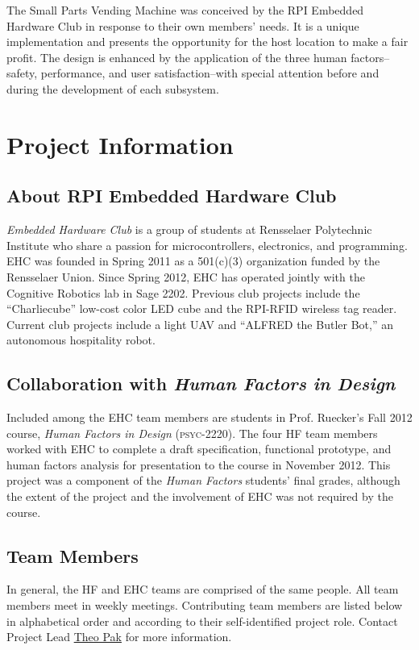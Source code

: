 \documentclass[12pt,draft,oneside]{article}
\begin{document}
The Small Parts Vending Machine was conceived by the RPI Embedded Hardware Club in response to their own members' needs. It is a unique implementation and presents the opportunity for the host location to make a fair profit. The design is enhanced by the application of the three human factors--safety, performance, and user satisfaction--with special attention before and during the development of each subsystem.


\section{Project Information}
\label{sec:info}

\subsection{About RPI Embedded Hardware Club}
\emph{Embedded Hardware Club} is a group of students at Rensselaer Polytechnic Institute who share a passion for microcontrollers, electronics, and programming. EHC was founded in Spring 2011 as a 501(c)(3) organization funded by the Rensselaer Union. Since Spring 2012, EHC has operated jointly with the Cognitive Robotics lab in Sage 2202. Previous club projects include the ``Charliecube'' low-cost color LED cube and the RPI-RFID wireless tag reader. Current club projects include a light UAV and ``ALFRED the Butler Bot,'' an autonomous hospitality robot. %

\subsection{Collaboration with \emph{Human Factors in Design}}
Included among the EHC team members are students in Prof. Ruecker's Fall 2012 course, \emph{Human Factors in Design} (\textsc{psyc-2220}). The four HF team members worked with EHC to complete a draft specification, functional prototype, and human factors analysis for presentation to the course in November 2012. This project was a component of the \emph{Human Factors} students' final grades, although the extent of the project and the involvement of EHC was not required by the course.

\subsection{Team Members}
In general, the HF and EHC teams are comprised of the same people. All team members meet in weekly meetings. Contributing team members are listed below in alphabetical order and according to their self-identified project role. Contact Project Lead \href{mailto:pakt@rpi.edu}{Theo Pak} for more information.
\end{document}

